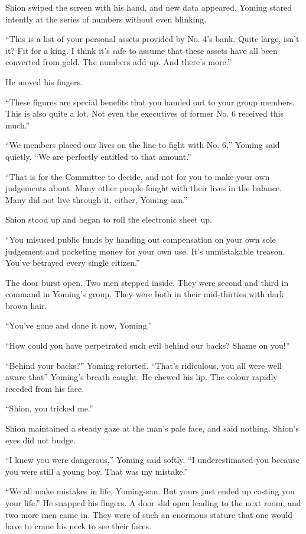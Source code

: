 Shion swiped the screen with his hand, and new data appeared. Yoming
stared intently at the series of numbers without even blinking.

``This is a list of your personal assets provided by No. 4's bank. Quite
large, isn't it? Fit for a king. I think it's safe to assume that these
assets have all been converted from gold. The numbers add up. And
there's more.''

He moved his fingers.

``These figures are special benefits that you handed out to your group
members. This is also quite a lot. Not even the executives of former No.
6 received this much.''

``\el We members placed our lives on the line to fight with No. 6,''
Yoming said quietly. ``We are perfectly entitled to that amount.''

``That is for the Committee to decide, and not for you to make your own
judgements about. Many other people fought with their lives in the
balance. Many did not live through it, either, Yoming-san.''

Shion stood up and began to roll the electronic sheet up.

``You misused public funds by handing out compensation on your own sole
judgement and pocketing money for your own use. It's unmistakable
treason. You've betrayed every single citizen.''

The door burst open. Two men stepped inside. They were second and third
in command in Yoming's group. They were both in their mid-thirties with
dark brown hair.

``You've gone and done it now, Yoming.''

``How could you have perpetrated such evil behind our backs? Shame on
you!''

``Behind your backs?'' Yoming retorted. ``That's ridiculous, you all
were well aware that\el '' Yoming's breath caught. He chewed his lip. The
colour rapidly receded from his face.

``Shion, you tricked me.''

Shion maintained a steady gaze at the man's pale face, and said nothing.
Shion's eyes did not budge.

``\el I knew you were dangerous,'' Yoming said softly. ``I underestimated
you because you were still a young boy. That was my mistake.''

``We all make mistakes in life, Yoming-san. But yours just ended up
costing you your life.'' He snapped his fingers. A door slid open
leading to the next room, and two more men came in. They were of such an
enormous stature that one would have to crane his neck to see their
faces.

